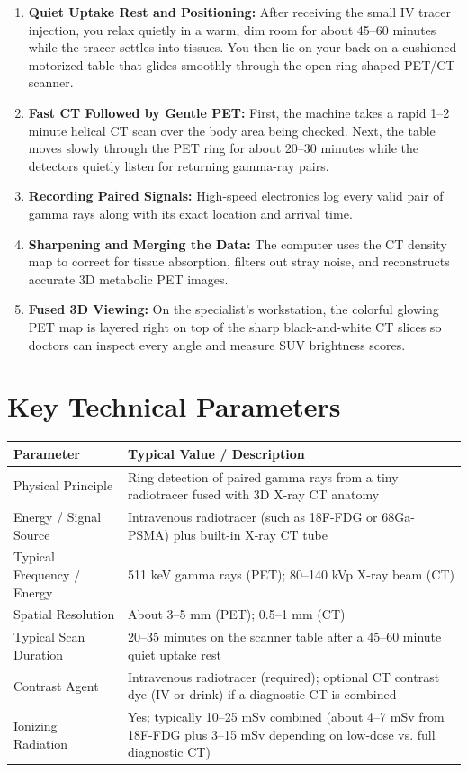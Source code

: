 \begin{enumerate}
    \item \textbf{Quiet Uptake Rest and Positioning:} After receiving the small IV tracer injection, you relax quietly in a warm, dim room for about 45--60 minutes while the tracer settles into tissues. You then lie on your back on a cushioned motorized table that glides smoothly through the open ring-shaped PET/CT scanner.
    \item \textbf{Fast CT Followed by Gentle PET:} First, the machine takes a rapid 1--2 minute helical CT scan over the body area being checked. Next, the table moves slowly through the PET ring for about 20--30 minutes while the detectors quietly listen for returning gamma-ray pairs.
    \item \textbf{Recording Paired Signals:} High-speed electronics log every valid pair of gamma rays along with its exact location and arrival time.
    \item \textbf{Sharpening and Merging the Data:} The computer uses the CT density map to correct for tissue absorption, filters out stray noise, and reconstructs accurate 3D metabolic PET images.
    \item \textbf{Fused 3D Viewing:} On the specialist's workstation, the colorful glowing PET map is layered right on top of the sharp black-and-white CT slices so doctors can inspect every angle and measure SUV brightness scores.
\end{enumerate}

\section{Key Technical Parameters}

\noindent
\begin{tabularx}{\textwidth}{@{}l X@{}}
\toprule
\textbf{Parameter} & \textbf{Typical Value / Description} \\
\midrule
Physical Principle & Ring detection of paired gamma rays from a tiny radiotracer fused with 3D X-ray CT anatomy \\
Energy / Signal Source & Intravenous radiotracer (such as 18F-FDG or 68Ga-PSMA) plus built-in X-ray CT tube \\
Typical Frequency / Energy & 511 keV gamma rays (PET); 80--140 kVp X-ray beam (CT) \\
Spatial Resolution & About 3--5 mm (PET); 0.5--1 mm (CT) \\
Typical Scan Duration & 20--35 minutes on the scanner table after a 45--60 minute quiet uptake rest \\
Contrast Agent & Intravenous radiotracer (required); optional CT contrast dye (IV or drink) if a diagnostic CT is combined \\
Ionizing Radiation & Yes; typically 10--25 mSv combined (about 4--7 mSv from 18F-FDG plus 3--15 mSv depending on low-dose vs. full diagnostic CT) \\
\bottomrule
\end{tabularx}

